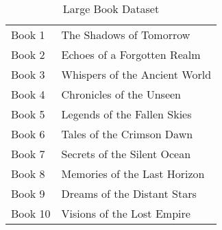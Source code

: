 \documentclass[
english,
smallborders
]{i6prcsht}
\begin{document}
\begin{table}[ht]
\begin{minipage}[t]{0.5\textwidth}
{\begin{tabular}{ll}
				Book 1        & The Shadows of Tomorrow       \\
				Book 2        & Echoes of a Forgotten Realm   \\
				Book 3        & Whispers of the Ancient World \\
				Book 4        & Chronicles of the Unseen      \\
				Book 5        & Legends of the Fallen Skies   \\
				Book 6        & Tales of the Crimson Dawn     \\
				Book 7        & Secrets of the Silent Ocean   \\
				Book 8        & Memories of the Last Horizon  \\
				Book 9        & Dreams of the Distant Stars   \\
				Book 10       & Visions of the Lost Empire    \\
			\end{tabular}
		}
	\end{minipage}
	\caption{Large Book Dataset}
	\label{tab:large-book-dataset}
\end{table}

\vspace*{1cm}
\end{document}

